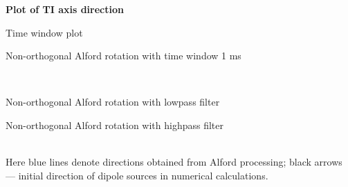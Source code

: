 \documentclass[a4paper,11pt]{article}
\begin{document}
\vspace{\baselineskip}

\textbf{Plot of TI axis direction}\\

\begin{minipage}[c]{0.47\linewidth}
\begin{center}
		Time window plot\\
		
\end{center}
\end{minipage}	
\begin{minipage}[c]{0.47\linewidth}
\begin{center}
		Non-orthogonal Alford rotation with time window 1 ms\\
		
\end{center}
\end{minipage} \hfill	 \\
\begin{minipage}[c]{0.47\linewidth}	
\begin{center}
		Non-orthogonal Alford rotation with lowpass filter\\
	  		\label{fig:rot4_gs_lp_scheme}
\end{center}	  		
\end{minipage}
\begin{minipage}[c]{0.47\linewidth}
\begin{center}
		Non-orthogonal Alford rotation with highpass filter\\
			\label{fig:rot4_gs_hp_scheme}
\end{center}
\end{minipage} \\

\footnotesize Here blue lines denote directions obtained from Alford processing; black arrows --- initial direction of dipole sources in numerical calculations.
\normalsize

\vspace{\baselineskip}
\vspace{\baselineskip}
\end{document}

